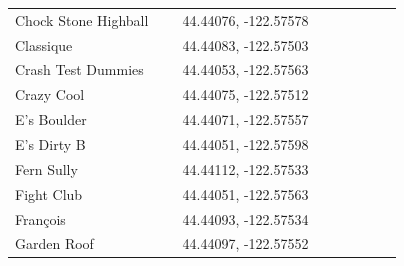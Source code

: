 \begin{flushleft}
\begin{center}
\begin{supertabular}{p{0.38\linewidth}p{0.5\linewidth}}
Chock Stone Highball & 44.44076, -122.57578 \\
Classique & 44.44083, -122.57503 \\
Crash Test Dummies & 44.44053, -122.57563 \\
Crazy Cool & 44.44075, -122.57512 \\
E's Boulder & 44.44071, -122.57557 \\
E's Dirty B & 44.44051, -122.57598 \\
Fern Sully & 44.44112, -122.57533 \\
Fight Club & 44.44051, -122.57563 \\
François & 44.44093, -122.57534 \\
Garden Roof & 44.44097, -122.57552 \\

\end{supertabular}
\end{center}
\end{flushleft}
